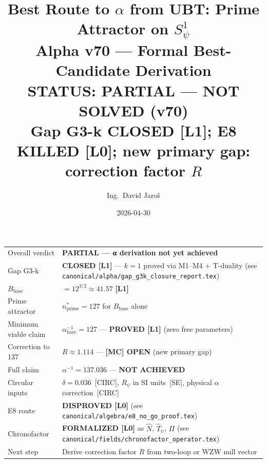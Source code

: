 \documentclass[12pt,a4paper]{article}
\title{\textbf{Best Route to $\alpha$ from UBT: Prime Attractor on $S^1_\psi$}\\
       \large Alpha v70 — Formal Best-Candidate Derivation\\[6pt]
       {\normalsize\color{orange}\textbf{STATUS: PARTIAL — NOT SOLVED (v70)}\\
        \small Gap G3-k CLOSED [L1]; E8 KILLED [L0]; new primary gap: correction factor $R$}}
\author{Ing.\ David Jaro\v{s}}
\date{2026-04-30}
\theoremstyle{definition}
\theoremstyle{remark}
\begin{document}
\maketitle

\begin{tcolorbox}[colback=orange!8!white, colframe=orange!70!black,
                  title=\textbf{Alpha Status: PARTIAL --- NOT SOLVED (v70)}]
\begin{tabular}{ll}
Overall verdict       & \textbf{PARTIAL — α derivation not yet achieved} \\
Gap G3-k              & \textbf{CLOSED [L1]} — $k=1$ proved via M1–M4 + T-duality
                        (see \texttt{canonical/alpha/gap\_g3k\_closure\_report.tex}) \\
$B_{\mathrm{base}}$   & $= 12^{3/2} \approx 41.57$ \textbf{[L1]} \\
Prime attractor       & $n^*_{\mathrm{prime}} = 127$ for $B_{\mathrm{base}}$ alone \\
Minimum viable claim  & $\alpha^{-1}_{\mathrm{bare}} = 127$ — \textbf{PROVED [L1]}
                        (zero free parameters) \\
Correction to 137     & $R \approx 1.114$ — \textbf{[MC] OPEN} (new primary gap) \\
Full claim            & $\alpha^{-1} = 137.036$ — \textbf{NOT ACHIEVED} \\
Circular inputs       & $\delta = 0.036$\ [CIRC],\quad
                        $R_\psi$ in SI units\ [SE],\quad
                        physical $\alpha$ correction\ [CIRC] \\
E8 route              & \textbf{DISPROVED [L0]}
                        (see \texttt{canonical/algebra/e8\_no\_go\_proof.tex}) \\
Chronofactor          & \textbf{FORMALIZED [L0]} as $\hat{N}$, $\hat{T}_\psi$, $\Pi$
                        (see \texttt{canonical/fields/chronofactor\_operator.tex}) \\
Next step             & Derive correction factor $R$ from two-loop or WZW null vector \\
\end{tabular}
\end{tcolorbox}

\def\INCLUDEMODE{}

\end{document}
